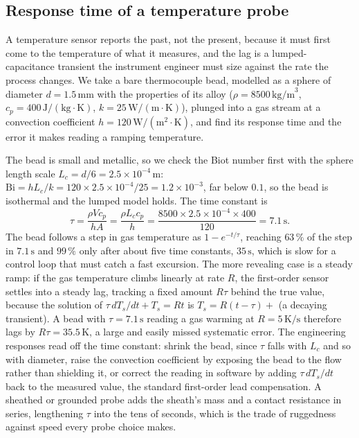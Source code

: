 \subsection{Response time of a temperature probe}

A temperature sensor reports the past, not the present, because it must first
come to the temperature of what it measures, and the lag is a lumped-
capacitance transient the instrument engineer must size against the rate the
process changes. We take a bare thermocouple bead, modelled as a sphere of
diameter $d = 1.5\,\si{\milli\meter}$ with the properties of its alloy
($\rho = 8500\,\text{kg/m}^3$, $c_p = 400\,\text{J}/(\text{kg}\cdot\si{
\kelvin})$, $k = 25\,\text{W}/(\text{m}\cdot\si{\kelvin})$), plunged into a
gas stream at a convection coefficient $h = 120\,\text{W}/(\text{m}^2\cdot
\si{\kelvin})$, and find its response time and the error it makes reading a
ramping temperature.

The bead is small and metallic, so we check the Biot number first with the
sphere length scale $L_c = d/6 = 2.5\times10^{-4}\,\text{m}$:
$\text{Bi} = h L_c/k = 120\times2.5\times10^{-4}/25 = 1.2\times10^{-3}$, far
below $0.1$, so the bead is isothermal and the lumped model holds. The time
constant is
\[
\tau = \frac{\rho V c_p}{h A} = \frac{\rho L_c c_p}{h} = \frac{8500\times
2.5\times10^{-4}\times400}{120} = 7.1\,\text{s}.
\]
The bead follows a step in gas temperature as $1 - e^{-t/\tau}$, reaching
$63\,\%$ of the step in $7.1\,\text{s}$ and $99\,\%$ only after about five
time constants, $35\,\text{s}$, which is slow for a control loop that must
catch a fast excursion. The more revealing case is a steady ramp: if the gas
temperature climbs linearly at rate $R$, the first-order sensor settles into a
steady lag, tracking a fixed amount $R\tau$ behind the true value, because the
solution of $\tau\,dT_s/dt + T_s = Rt$ is $T_s = R(t - \tau) + $ (a decaying
transient). A bead with $\tau = 7.1\,\text{s}$ reading a gas warming at
$R = 5\,\si{\kelvin}/\text{s}$ therefore lags by $R\tau = 35.5\,\si{\kelvin}$,
a large and easily missed systematic error. The engineering responses read
off the time constant: shrink the bead, since $\tau$ falls with $L_c$ and so
with diameter, raise the convection coefficient by exposing the bead to the
flow rather than shielding it, or correct the reading in software by adding
$\tau\,dT_s/dt$ back to the measured value, the standard first-order lead
compensation. A sheathed or grounded probe adds the sheath's mass and a
contact resistance in series, lengthening $\tau$ into the tens of seconds,
which is the trade of ruggedness against speed every probe choice makes.


